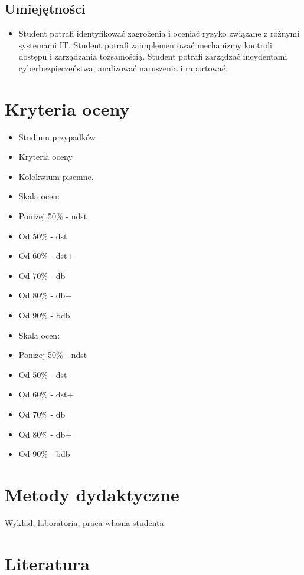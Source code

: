 \documentclass[12pt, a4paper]{article}
\begin{document}
\subsection*{Umiejętności}
\begin{itemize}
  \item Student potrafi identyfikować zagrożenia i oceniać ryzyko związane z różnymi systemami IT. Student potrafi zaimplementować mechanizmy kontroli dostępu i zarządzania tożsamością. Student potrafi zarządzać incydentami cyberbezpieczeństwa, analizować naruszenia i raportować.
\end{itemize}

\section{Kryteria oceny}

\begin{itemize}
  \item Studium przypadków
  \item Kryteria oceny
  \item Kolokwium pisemne.
  \item Skala ocen:
  \item Poniżej 50\% - ndst
  \item Od 50\% - dst
  \item Od 60\% - dst+
  \item Od 70\% - db
  \item Od 80\% - db+
  \item Od 90\% - bdb
  \item Skala ocen:
  \item Poniżej 50\% - ndst
  \item Od 50\% - dst
  \item Od 60\% - dst+
  \item Od 70\% - db
  \item Od 80\% - db+
  \item Od 90\% - bdb
\end{itemize}

\section{Metody dydaktyczne}

Wykład, laboratoria, praca własna studenta.

\section{Literatura}
\end{document}
